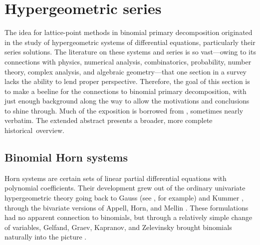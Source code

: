 \documentclass[12pt]{amsart}
\numberwithin{equation}{section}
\theoremstyle{definition}
\begin{document}
\section{Hypergeometric series}\label{s:horn}

The idea for lattice-point methods in binomial primary decomposition
originated in the study of hypergeometric systems of differential
equations, particularly their series solutions.  The literature on
these systems and series is so vast---owing to its connections with
physics, numerical analysis, combinatorics, probability, number
theory, complex analysis, and algebraic geometry---that one section in
a survey lacks the ability to lend proper perspective.  Therefore, the
goal of this section is to make a beeline for the connections to
binomial primary decomposition, with just enough background along the
way to allow the motivations and conclusions to shine through.  Much
of the exposition is borrowed from \cite{dmm-mega,dmm}, sometimes
nearly verbatim.  The extended abstract \cite{dmm-mega} presents a
broader, more complete historical~overview.

\subsection{Binomial Horn systems}\label{s:horn'}
Horn systems are certain sets of linear partial differential equations
with polynomial coefficients.  Their development grew out of the
ordinary univariate hypergeometric theory going back to Gauss (see
\cite{sk85}, for example) and Kummer \cite{kummer}, through the
bivariate versions of Appell, Horn, and Mellin
\cite{appell,horn89,horn31,mellin}.  These formulations had no
apparent connection to binomials, but through a relatively simple
change of variables, Gelfand, Graev, Kapranov, and Zelevinsky brought
binomials naturally into the picture \cite{ggz,gkz}.
\end{document}
